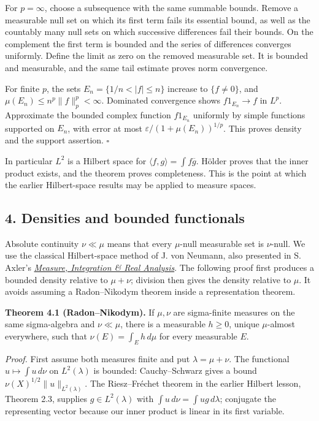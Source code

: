 \documentclass[
  english,
  11pt,
  a4paper,
]{article}
\begin{document}
For \(p=\infty\), choose a subsequence with the same summable bounds.
Remove a measurable null set on which its first term fails its essential
bound, as well as the countably many null sets on which successive
differences fail their bounds. On the complement the first term is
bounded and the series of differences converges uniformly. Define the
limit as zero on the removed measurable set. It is bounded and
measurable, and the same tail estimate proves norm convergence.

For finite \(p\), the sets \(E_n=\{1/n<|f|\leq n\}\) increase to
\(\{f\ne0\}\), and \(\mu(E_n)\leq n^p\|f\|_p^p<\infty\). Dominated
convergence shows \(f1_{E_n}\to f\) in \(L^p\). Approximate the bounded
complex function \(f1_{E_n}\) uniformly by simple functions supported on
\(E_n\), with error at most \(\varepsilon/(1+\mu(E_n))^{1/p}\). This
proves density and the support assertion. \(\square\)

In particular \(L^2\) is a Hilbert space for
\(\langle f,g\rangle=\int f\overline g\). Hölder proves that the inner
product exists, and the theorem proves completeness. This is the point
at which the earlier Hilbert-space results may be applied to measure
spaces.

\subsection{4. Densities and bounded
functionals}\label{measure-and-hilbert-space-tools--4-densities-and-bounded-functionals}

Absolute continuity \(\nu\ll\mu\) means that every \(\mu\)-null
measurable set is \(\nu\)-null. We use the classical Hilbert-space
method of J. von Neumann, also presented in S. Axler's
\href{https://measure.axler.net/MIRA.pdf}{\emph{Measure, Integration \&
Real Analysis}}. The following proof first produces a bounded density
relative to \(\mu+\nu\); division then gives the density relative to
\(\mu\). It avoids assuming a Radon--Nikodym theorem inside a
representation theorem.

\textbf{Theorem 4.1 (Radon--Nikodym).} If \(\mu,\nu\) are sigma-finite
measures on the same sigma-algebra and \(\nu\ll\mu\), there is a
measurable \(h\geq0\), unique \(\mu\)-almost everywhere, such that
\(\nu(E)=\int_Eh\,d\mu\) for every measurable \(E\).

\emph{Proof.} First assume both measures finite and put
\(\lambda=\mu+\nu\). The functional \(u\mapsto\int u\,d\nu\) on
\(L^2(\lambda)\) is bounded: Cauchy--Schwarz gives a bound
\(\nu(X)^{1/2}\|u\|_{L^2(\lambda)}\). The Riesz--Fréchet theorem in the
earlier Hilbert lesson, Theorem 2.3, supplies \(g\in L^2(\lambda)\) with
\(\int u\,d\nu=\int ug\,d\lambda\); conjugate the representing vector
because our inner product is linear in its first variable.
\end{document}

